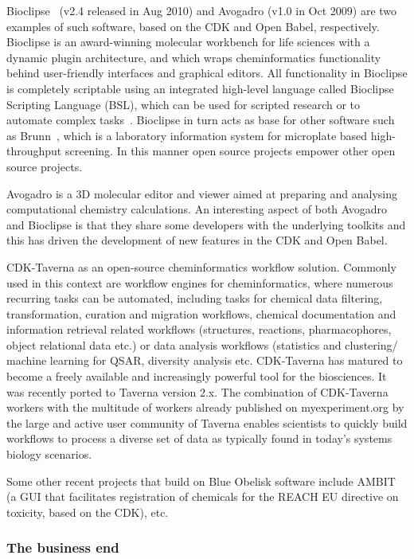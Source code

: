 \documentclass[10pt]{bmc_article}
\newenvironment{bmcformat}{\begin{raggedright}\baselineskip20pt\sloppy\setboolean{publ}{false}}{\end{raggedright}\baselineskip20pt\sloppy}
\begin{document}
\begin{bmcformat}
Bioclipse~\cite{Spjuth:2007fk} (v2.4 released in Aug 2010) and Avogadro
\cite{WebAvogadro} (v1.0 in Oct 2009) are two examples of such software, based
on the CDK and Open Babel, respectively. Bioclipse is an award-winning
molecular workbench for life sciences with a dynamic plugin architecture, and
which wraps cheminformatics functionality behind user-friendly interfaces and
graphical editors. All functionality in Bioclipse is completely scriptable
using an integrated high-level language called Bioclipse Scripting Language
(BSL), which can be used for scripted research or to automate complex
tasks~\cite{Bioclipse2}. Bioclipse in turn acts as base for other software
such as Brunn~\cite{Brunn}, which is a laboratory information system for
microplate based high-throughput screening. In this manner open source projects
empower other open source projects.

Avogadro is a 3D molecular editor and viewer aimed at preparing
and analysing computational chemistry calculations. An interesting
aspect of both Avogadro and Bioclipse is that they share some developers
with the underlying toolkits and this has driven the development of new
features in the CDK and Open Babel.

CDK-Taverna \cite{Kuhn:2010p4001} as an open-source cheminformatics workflow solution.
Commonly used in this context are workflow engines for cheminformatics, where numerous recurring tasks can be automated, including tasks for chemical data filtering, transformation, curation and migration workflows, chemical documentation and information retrieval related workflows (structures, reactions, pharmacophores, object relational data etc.) or data analysis workflows (statistics and clustering/ machine learning for QSAR, diversity analysis etc. 
CDK-Taverna has matured to become a freely available and increasingly powerful tool for the biosciences. It was recently ported to 
Taverna version 2.x.
The combination of CDK-Taverna workers with the multitude of workers already published on myexperiment.org by the large and active user community of Taverna enables scientists to quickly build workflows to process a diverse set of data as typically found in today's systems biology scenarios.

Some other recent projects that build on Blue Obelisk software include
AMBIT (a GUI that facilitates registration of chemicals for the REACH
EU directive on toxicity, based on the CDK), etc.

\subsubsection*{The business end}


\end{bmcformat}
\end{document}
